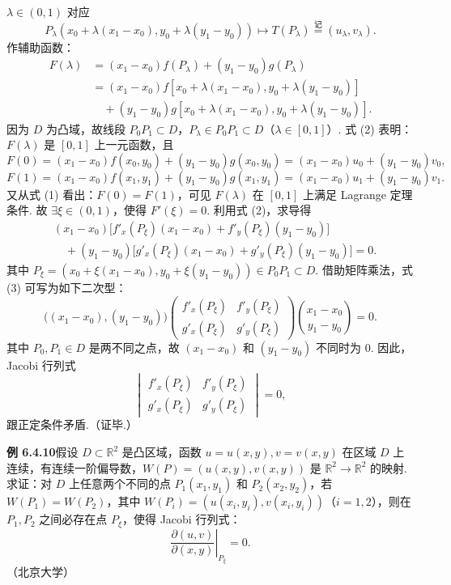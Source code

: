 \documentclass[UTF8,12pt,a4paper,fontset=fandol]{ctexart}
\begin{document}
$\lambda\in(0,1)$ 对应
\[
  P_\lambda(x_0+\lambda(x_1-x_0),y_0+\lambda(y_1-y_0))\mapsto T(P_\lambda)\overset{\text{记}}{=}(u_\lambda,v_\lambda).
\]
作辅助函数：
\begin{equation}
\begin{aligned}
  F(\lambda)
  &=(x_1-x_0)f(P_\lambda)+(y_1-y_0)g(P_\lambda)\\
  &=(x_1-x_0)f[x_0+\lambda(x_1-x_0),y_0+\lambda(y_1-y_0)]\\
  &\quad +(y_1-y_0)g[x_0+\lambda(x_1-x_0),y_0+\lambda(y_1-y_0)].
\end{aligned}
\end{equation}
因为 $D$ 为凸域，故线段 $P_0P_1\subset D$，$P_\lambda\in P_0P_1\subset D$（$\lambda\in[0,1]$）. 式 (2) 表明：$F(\lambda)$ 是 $[0,1]$ 上一元函数，且
\[
  F(0)=(x_1-x_0)f(x_0,y_0)+(y_1-y_0)g(x_0,y_0)
  =(x_1-x_0)u_0+(y_1-y_0)v_0,
\]
\[
  F(1)=(x_1-x_0)f(x_1,y_1)+(y_1-y_0)g(x_1,y_1)
  =(x_1-x_0)u_1+(y_1-y_0)v_1.
\]
又从式 (1) 看出：$F(0)=F(1)$，可见 $F(\lambda)$ 在 $[0,1]$ 上满足 Lagrange 定理条件. 故 $\exists\xi\in(0,1)$，使得 $F'(\xi)=0$. 利用式 (2)，求导得
\begin{equation}
\begin{aligned}
  &(x_1-x_0)\bigl[f'_x(P_\xi)(x_1-x_0)+f'_y(P_\xi)(y_1-y_0)\bigr]\\
  &\quad +(y_1-y_0)\bigl[g'_x(P_\xi)(x_1-x_0)+g'_y(P_\xi)(y_1-y_0)\bigr]=0.
\end{aligned}
\end{equation}
其中 $P_\xi=(x_0+\xi(x_1-x_0),y_0+\xi(y_1-y_0))\in P_0P_1\subset D$. 借助矩阵乘法，式 (3) 可写为如下二次型：
\[
  \bigl((x_1-x_0),(y_1-y_0)\bigr)
  \begin{pmatrix}
    f'_x(P_\xi) & f'_y(P_\xi)\\
    g'_x(P_\xi) & g'_y(P_\xi)
  \end{pmatrix}
  \binom{x_1-x_0}{y_1-y_0}=0.
\]
其中 $P_0,P_1\in D$ 是两不同之点，故 $(x_1-x_0)$ 和 $(y_1-y_0)$ 不同时为 $0$. 因此，Jacobi 行列式
\[
  \begin{vmatrix}
    f'_x(P_\xi) & f'_y(P_\xi)\\
    g'_x(P_\xi) & g'_y(P_\xi)
  \end{vmatrix}
  =0,
\]
跟正定条件矛盾.（证毕.）

\noindent\textbf{例 6.4.10}\quad 假设 $D\subset\mathbb R^2$ 是凸区域，函数 $u=u(x,y),v=v(x,y)$ 在区域 $D$ 上连续，有连续一阶偏导数，$W(P)=(u(x,y),v(x,y))$ 是 $\mathbb R^2\to\mathbb R^2$ 的映射. 求证：对 $D$ 上任意两个不同的点 $P_1(x_1,y_1)$ 和 $P_2(x_2,y_2)$，若 $W(P_1)=W(P_2)$，其中 $W(P_i)=(u(x_i,y_i),v(x_i,y_i))$（$i=1,2$），则在 $P_1,P_2$ 之间必存在点 $P_\xi$，使得 Jacobi 行列式：
\[
  \left.\frac{\partial(u,v)}{\partial(x,y)}\right|_{P_\xi}=0.
\]
（北京大学）
\end{document}
